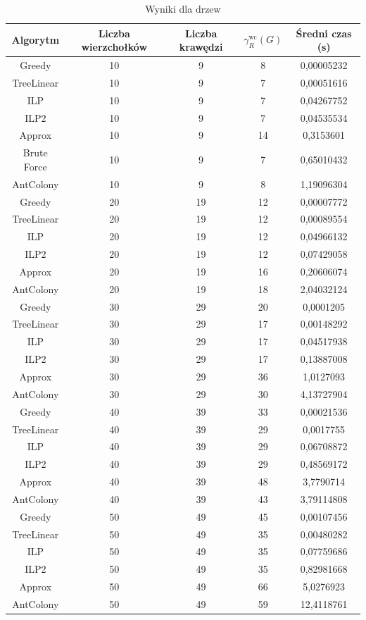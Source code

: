 \begin{table}[H]
    \centering
    \begin{tabular}{|c|c|c|c|c|}
    \hline
    Algorytm & Liczba wierzchołków & Liczba krawędzi & $\gamma^{\text{wc}}_R(G)$ & Średni czas (s) \\
    \hline
    Greedy & 10 & 9 & 8 & 0,00005232 \\
    TreeLinear & 10 & 9 & 7 & 0,00051616 \\
    ILP & 10 & 9 & 7 & 0,04267752 \\
    ILP2 & 10 & 9 & 7 & 0,04535534 \\
    Approx & 10 & 9 & 14 & 0,3153601 \\
    Brute Force & 10 & 9 & 7 & 0,65010432 \\
    AntColony & 10 & 9 & 8 & 1,19096304 \\
    \hline
    Greedy & 20 & 19 & 12 & 0,00007772 \\
    TreeLinear & 20 & 19 & 12 & 0,00089554 \\
    ILP & 20 & 19 & 12 & 0,04966132 \\
    ILP2 & 20 & 19 & 12 & 0,07429058 \\
    Approx & 20 & 19 & 16 & 0,20606074 \\
    AntColony & 20 & 19 & 18 & 2,04032124 \\
    \hline
    Greedy & 30 & 29 & 20 & 0,0001205 \\
    TreeLinear & 30 & 29 & 17 & 0,00148292 \\
    ILP & 30 & 29 & 17 & 0,04517938 \\
    ILP2 & 30 & 29 & 17 & 0,13887008 \\
    Approx & 30 & 29 & 36 & 1,0127093 \\
    AntColony & 30 & 29 & 30 & 4,13727904 \\
     \hline
     Greedy & 40 & 39 & 33 & 0,00021536 \\
     TreeLinear & 40 & 39 & 29 & 0,0017755 \\
     ILP & 40 & 39 & 29 & 0,06708872 \\
     ILP2 & 40 & 39 & 29 & 0,48569172 \\
     Approx & 40 & 39 & 48 & 3,7790714 \\
     AntColony & 40 & 39 & 43 & 3,79114808 \\
    \hline
    Greedy & 50 & 49 & 45 & 0,00107456 \\
    TreeLinear & 50 & 49 & 35 & 0,00480282 \\
    ILP & 50 & 49 & 35 & 0,07759686 \\
    ILP2 & 50 & 49 & 35 & 0,82981668 \\
    Approx & 50 & 49 & 66 & 5,0276923 \\
    AntColony & 50 & 49 & 59 & 12,4118761 \\ 
    \hline
    \end{tabular}
    \caption{Wyniki dla drzew}
    \end{table}


